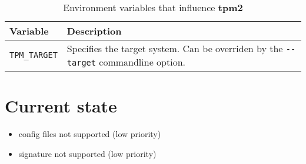 \documentclass[a4paper]{scrartcl}
\newcommand{\program}[1]{\textbf{#1}}
\begin{document}
	\begin{table}[ht]
		\centering
		
		\begin{tabularx}{.9\textwidth}{l|X}
			Variable & Description \\
			\hline
			\texttt{TPM\_TARGET} & Specifies the target system. Can be overriden by the \texttt{-{}-target} commandline option. \\
		\end{tabularx}
	
		\caption{Environment variables that influence \program{tpm2}}
		\label{tab:environment_variables_for_tpm2}
	\end{table}


	\section{Current state}
	\label{sec:current_state}
	
	\begin{itemize}
		\item config files not supported (low priority)
		\item signature not supported (low priority)
	\end{itemize}
	
\end{document}
